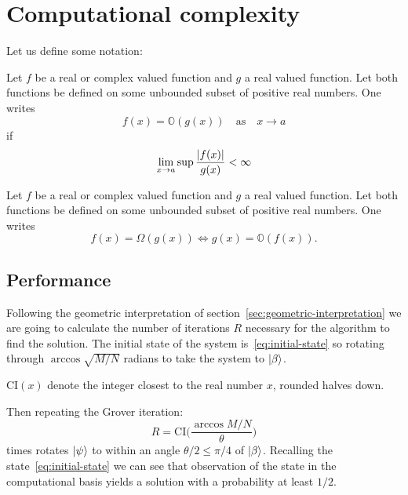 \section{Computational complexity}
Let us define some notation:
\begin{defn}
   Let $f$ be a real or complex valued function and $g$ a real valued function. Let both functions be defined on some unbounded subset of positive real numbers. One writes
   \begin{equation*}
       f(x) = \mathbb{O}(g(x)) \quad \text{as} \quad x \rightarrow a
   \end{equation*}
   if 
   \begin{equation*}
      \lim_{x \to a} \sup{\frac{\lvert f(x)\rvert}{g(x)}} < \infty
   \end{equation*}
   \end{defn}
   \begin{defn}
      Let $f$ be a real or complex valued function and $g$ a real valued function. Let both functions be defined on some unbounded subset of positive real numbers. One writes
   \begin{equation*}
       f(x) = \Omega(g(x))
    \Longleftrightarrow
      g(x) = \mathbb{O}(f(x)).
   \end{equation*}
   \end{defn}
   

\subsection{Performance}\label{sec:performance}
Following the geometric interpretation of section~\ref{sec:geometric-interpretation} we are going to calculate the number of iterations $R$ necessary for the algorithm to find the solution. The initial state of the system is~\ref{eq:initial-state} so rotating through $\arccos{\sqrt{M/N}}$ radians to take the system to $\ket{\beta}$.
\begin{defn}
$\text{CI}(x)$ denote the integer closest to the real number $x$, rounded halves down.
\end{defn}
Then repeating the Grover iteration:
\begin{equation}\label{eq:R}
    R = \text{CI}\biggl(\frac{\arccos{M/N}}{\theta}\biggr)
\end{equation}
times rotates $\ket{\psi}$ to within an angle $\theta/2 \leq \pi/4$ of $\ket{\beta}$. Recalling the state~\ref{eq:initial-state} we can see that observation of the state in the computational basis yields a solution with a probability at least $1/2$. 

